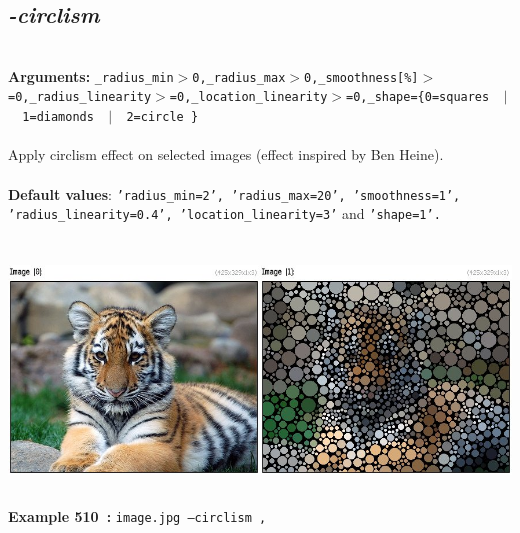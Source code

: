 \documentclass[a4paper,11pt,twoside]{book}
\begin{document}
\subsection{\emph{-circlism} }\vspace*{-0.5em}
~\\\textbf{Arguments: } 
{\small \texttt{\_radius\_min$>$0,\_radius\_max$>$0,\_smoothness[\%]$>$=0,\_radius\_linearity$>$=0,\_location\_linearity$>$=0,\_shape=\{0=squares ~$|$~ 1=diamonds ~$|$~ 2=circle \}}}\\~\\
Apply circlism effect on selected images (effect inspired by Ben Heine).
~\\~\\\textbf{Default values}: {\small \texttt{'radius\_min=2', 'radius\_max=20', 'smoothness=1', 'radius\_linearity=0.4', 'location\_linearity=3'} and \texttt{'shape=1'.}}
\begin{center}\includegraphics[keepaspectratio=true,height=7cm,width=\textwidth]{img/gmic_def510.jpg}\\
{\footnotesize \textbf{Example 510~:} \texttt{image.jpg --circlism ,}}
\end{center}
\end{document}
